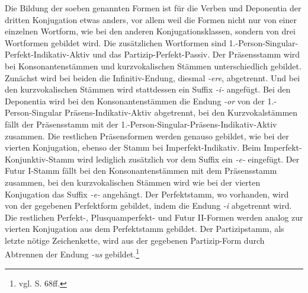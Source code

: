 \documentclass[fontsize=12pt,abstract=on,titlepage,bibliography=totoc,ngerman,listof=totoc]{scrreprt}
\begin{document}
Die Bildung der soeben genannten Formen ist für die Verben und Deponentia der dritten Konjugation etwas anders, vor allem weil die Formen nicht nur von einer einzelnen Wortform, wie bei den anderen Konjugationsklassen, sondern von drei Wortformen gebildet wird. Die zusätzlichen Wortformen sind 1.-Person-Singular-Perfekt-Indikativ-Aktiv und das Partizip-Perfekt-Passiv. Der Präsensstamm wird bei Konsonantenstämmen und kurzvokalischen Stämmen unterschiedlich gebildet. Zunächst wird bei beiden die Infinitiv-Endung, diesmal \textit{-ere}, abgetrennt. Und bei den kurzvokalischen Stämmen wird stattdessen ein Suffix \textit{-i-} angefügt. Bei den Deponentia wird bei den Konsonantenstämmen die Endung \textit{-or} von der 1.-Person-Singular Präsens-Indikativ-Aktiv abgetrennt, bei den Kurzvokalstämmen fällt der Präsensstamm mit der 1.-Person-Singular-Präsens-Indikativ-Aktiv zusammen. Die restlichen Präsensformen werden genauso gebildet, wie bei der vierten Konjugation, ebenso der Stamm bei Imperfekt-Indikativ. Beim Imperfekt-Konjunktiv-Stamm wird lediglich zusätzlich vor dem Suffix ein \textit{-e-} eingefügt. Der Futur I-Stamm fällt bei den Konsonantenstämmen mit dem Präsensstamm zusammen, bei den kurzvokalischen Stämmen wird wie bei der vierten Konjugation das Suffix \textit{-e-} angehängt. Der Perfektstamm, wo vorhanden, wird von der gegebenen Perfektform gebildet, indem die Endung \textit{-i} abgetrennt wird. Die restlichen Perfekt-, Plusquamperfekt- und Futur II-Formen werden analog zur vierten Konjugation aus dem Perfektstamm gebildet. Der Partizipstamm, als letzte nötige Zeichenkette, wird aus der gegebenen Partizip-Form durch Abtrennen der Endung \textit{-us} gebildet.\footnote{vgl. \cite{BAYER-LINDAUER1994} S. 68ff.} \par
\end{document}
